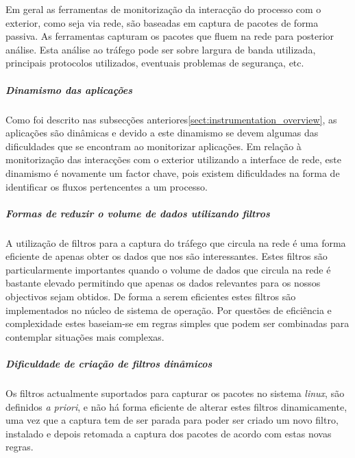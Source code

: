 % 
% 
% 

Em geral as ferramentas de monitorização da interacção do processo com
o exterior, como seja via rede, são baseadas em captura de pacotes de forma
passiva. As ferramentas capturam os pacotes que fluem na rede para posterior
análise. Esta análise ao tráfego pode ser sobre largura de banda utilizada,
principais protocolos utilizados, eventuais problemas de segurança, etc.

\subparagraph*{Dinamismo das aplicações}
Como foi descrito nas subsecções anteriores\ref{sect:instrumentation_overview}, as aplicações são dinâmicas e devido a este dinamismo se devem algumas das dificuldades que se encontram ao monitorizar aplicações. Em relação à monitorização das interacções com o exterior utilizando a interface de rede, este dinamismo é novamente um factor chave, pois existem dificuldades na forma de identificar os fluxos pertencentes a um processo.

\subparagraph*{Formas de reduzir o volume de dados utilizando filtros}
A utilização de filtros para a captura do tráfego que circula na rede é uma forma eficiente de apenas obter os dados que nos são interessantes. Estes filtros são particularmente importantes quando o volume de dados que circula na rede é bastante elevado permitindo que apenas os dados relevantes para os nossos objectivos sejam obtidos. De forma a serem eficientes estes filtros são implementados no núcleo de sistema de operação. Por questões de eficiência e complexidade estes baseiam-se em regras simples que podem ser combinadas para contemplar situações mais complexas.

\subparagraph*{Dificuldade de criação de filtros dinâmicos}
Os filtros actualmente suportados para capturar os pacotes no sistema \textit{linux}, são definidos \textit{a priori}, e não há forma eficiente de alterar estes filtros dinamicamente, uma vez que a captura tem de ser parada para poder ser criado um novo filtro, instalado e depois retomada a captura dos pacotes de acordo com estas novas regras.

